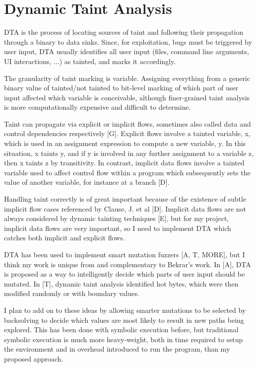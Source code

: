 \documentclass[11pt,expanded,copyright]{fsuthesis}
\begin{document}
\section{Dynamic Taint Analysis}

DTA is the process of locating sources of taint and following their propagation through a binary to data sinks. Since, for exploitation, bugs must be triggered by user input, DTA usually identifies all user input (files, command line arguments, UI interactions, ...) as tainted, and marks it accordingly.

The granularity of taint marking is variable. Assigning everything from a generic binary value of tainted/not tainted to bit-level marking of which part of user input affected which variable is conceivable, although finer-grained taint analysis is more computationally expensive and difficult to determine. 

Taint can propagate via explicit or implicit flows, sometimes also called data and control dependencies respectively [G]. Explicit flows involve a tainted variable, x, which is used in an assignment expression to compute a new variable, y. In this situation, x taints y, and if y is involved in any further assignment to a variable z, then x taints z by transitivity. In contrast, implicit data flows involve a tainted variable used to affect control flow within a program which subsequently sets the value of another variable, for instance at a branch [D]. 

Handling taint correctly is of great important because of the existence of subtle implicit flow cases referenced by Clause, J. et al [D]. Implicit data flows are not always considered by dynamic tainting techniques [E], but for my project, implicit data flows are very important, so I need to implement DTA which catches both implicit and explicit flows.

DTA has been used to implement smart mutation fuzzers [A, T, MORE], but I think my work is unique from and complementary to Bekrar's work. In [A], DTA is proposed as a way to intelligently decide which parts of user input should be mutated. In [T], dynamic taint analysis identified hot bytes, which were then modified randomly or with boundary values.

I plan to add on to these ideas by allowing smarter mutations to be selected by backsolving to decide which values are most likely to result in new paths being explored. This has been done with symbolic execution before, but traditional symbolic execution is much more heavy-weight, both in time required to setup the environment and in overhead introduced to run the program, than my proposed approach.
\end{document}
